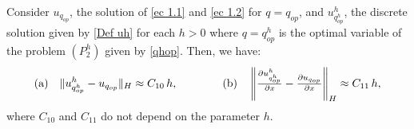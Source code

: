 \documentclass[axioms,article,submit,moreauthors]{Definitions/mdpi}
\newcommand\pder[2][]{\ensuremath{\tfrac{\partial#1}{\partial#2}}}
\begin{document}
     
  
\begin{Lemma} Consider $u_{q_{op}}$, the solution of \eqref{ec 1.1} and \eqref{ec 1.2} for $q= q_{op}$, and ${u^h_{q^h_{op}}}$, 
 the discrete solution given by \eqref{Def uh} for each $h>0$ where $q={q^h_{op}}$ is the optimal variable of the problem ${(P^h_2)}$ given by \eqref{qhop}. Then, we have:
  \begin{equation}  \label{difu-problema2} {\rm (a)} \quad  			      
  				  \lVert {u^h_{q^h_{op}}}- u_{q_{op}}  \rVert _H \approx C_{10}\, h,
  \qquad \qquad
     {\rm (b)}\quad
        \left\lVert \pder[{u^h_{q^h_{op}}}]{x} - \pder[u_{q_{op}}]{x} \right\rVert _H \approx C_{11} \,h,
\end{equation}
 \noindent where $C_{10}$ and $C_{11}$ do not depend on the parameter $h.$
     
\end{Lemma}
   
   
   
\end{document}
